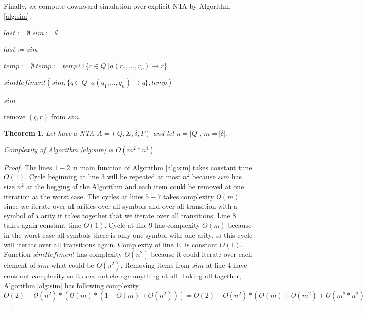 \documentclass[a4paper, 12pt]{article}
\let\oldnl\nl%
\newcommand{\nonl}{\renewcommand{\nl}{\let\nl\oldnl}}%
\newtheorem{theorem}{Theorem}
\begin{document}
Finally, we compute downward simulation over explicit NTA by Algorithm \ref{alg:sim}.
\begin{algorithm}[h]
\label{alg:sim}
    
	$last := \emptyset $\;
    $sim := \emptyset $\;
	{
		$last := sim$\;
		{
			{
				{
					$temp := \emptyset$\;
					{
						$temp := temp \cup \{r \in Q \,|\, a(r_1,\ldots, r_n) \rightarrow r\}$\;
					}

					$simRefiment(sim, \{q \in Q \,|\, a(q_1,\ldots, q_n) \rightarrow q\}, temp)$\;
				}
			}
		}

	}
	\Return $sim$\;
	\DontPrintSemicolon \nonl\;
	\setcounter{AlgoLine}{0}

	\nonl {}
	{
		{
			{
				{
					remove $(q,r)$ from $sim$ \;
				}
			}
		}
	 }
	 \caption{Computing simulation on a NTA. The algorithm is based on the one in \cite{lengal:trees}}
\end{algorithm}

\begin{theorem}
	\label{the:nfacompl}
Let have a NTA $A = (Q, \Sigma, \delta, F)$ and let $n = |Q|$, $m = |\delta|$.

Complexity of Algorithm \ref{alg:sim} is $O(m^2*n^4)$
\end{theorem}

\begin{proof}
	The lines $1-2$ in main function of Algorithm \ref{alg:sim} takes constant time $O(1)$.
	Cycle beginning at line $3$ will be repeated at most $n^2$ because $sim$ has size $n^2$ at the begging of the Algorithm
	and each item could be removed at one iteration at the worst case.
	The cycles at lines $5-7$ takes complexity $O(m)$ since we iterate over all arities over all symbols and over all transition
	with a symbol of a arity it takes together that we iterate over all transitions.
	Line $8$ takes again constant time $O(1)$.
	Cycle at line $9$ has complexity $O(m)$ because in the worst case all symbols there is only one symbol with one arity.
	so this cycle will iterate over all transitions again.
	Complexity of line $10$ is constant $O(1)$.
	Function $simRefiment$ has complexity $O(n^2)$ because it could iterate over each element of $sim$ what could be $O(n^2)$.
	Removing items from $sim$ at line $4$ have constant complexity so it does not change anything at all.
	Taking all together, Algorithm \ref{alg:sim} has following complexity 
	$O(2) + O(n^2)*(O(m)*(1+O(m)+O(n^2)))=
	O(2) + O(n^2)*(O(m)+O(m^2)+O(m^2*n^2)) =
	O(n^2)*(O(m^2*n^2)) =
	O(m^2*n^4)$
\end{proof}
\end{document}
